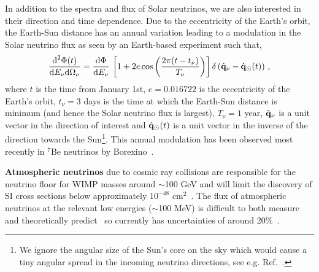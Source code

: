 In addition to the spectra and flux of Solar neutrinos, we are also interested in their direction and time dependence. Due to the eccentricity of the Earth's orbit, the Earth-Sun distance has an annual variation leading to a modulation in the Solar neutrino flux as seen by an Earth-based experiment such that,
\begin{equation}
  \frac{\textrm{d}^2 \Phi(t)}{\textrm{d}E_\nu \textrm{d}\Omega_\nu}  =  \frac{\textrm{d} \Phi}{\textrm{d} E_\nu} \,\left[ 1 + 2 e \cos\left(\frac{2\pi(t- t_\nu)}{T_\nu}\right) \right] 
 \delta\left(\hat{{\bf q}}_\nu-\hat{{\bf q}}_\odot(t)\right) \,,
\label{eq:solarneutrinoflux_directional}
\end{equation}
where $t$ is the time from January 1st, $e = 0.016722$ is the eccentricity of the Earth's orbit, $t_{\nu} = 3$ days is the time at which the Earth-Sun distance is minimum (and hence the Solar neutrino flux is largest), $T_{\nu} = 1$ year, $\hat{{\bf q}}_{\nu}$ is a unit vector in the direction of interest and $\hat{{\bf q}}_\odot(t)$ is a unit vector in the inverse of the direction towards the Sun\footnote{We ignore the angular size of the Sun's core on the sky which would cause a tiny angular spread in the incoming neutrino directions, see e.g. Ref.~\cite{Davis:2016hil}.}. This annual modulation has been observed most recently in $^7$Be neutrinos by Borexino~\cite{Agostini:2017iiq}.


{\bf Atmospheric neutrinos} due to cosmic ray collisions are responsible for the neutrino floor for WIMP masses around $\sim$100 GeV and will limit the discovery of SI cross sections below approximately $10^{-48}$ cm$^2$~\cite{Strigari:2009bq,Billard:2013qya,Ruppin:2014bra}. The flux of atmospheric neutrinos at the relevant low energies ($\sim$100 MeV) is difficult to both measure and theoretically predict~\cite{Battistoni:2005pd} so currently has uncertainties of around 20\%~\cite{Honda:2011nf}.


